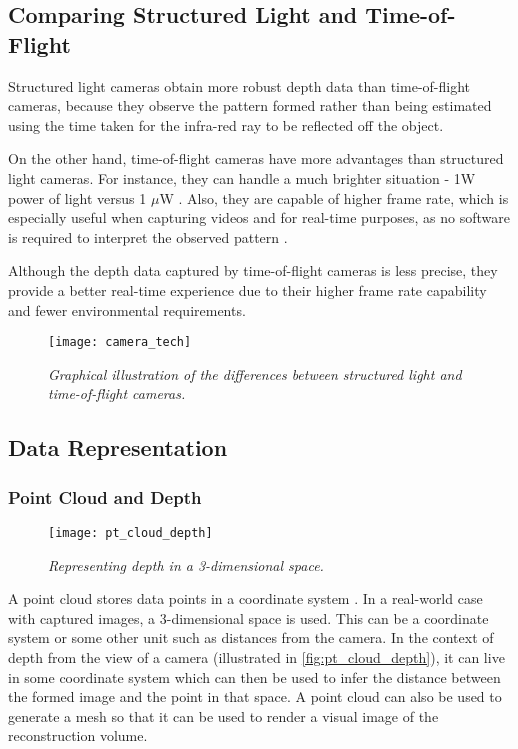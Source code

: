 \subsection{Comparing Structured Light and Time-of-Flight}
Structured light cameras obtain more robust depth data than time-of-flight cameras, because they observe the pattern formed rather than being estimated using the time taken for the infra-red ray to be reflected off the object. 

On the other hand, time-of-flight cameras have more advantages than structured light cameras. For instance, they can handle a much brighter situation - 1W power of light versus 1 $\mu$W \cite{kinect-version-compare}. Also, they are capable of higher frame rate, which is especially useful when capturing videos and for real-time purposes, as no software is required to interpret the observed pattern \cite{kinect-cam-tech}.

Although the depth data captured by time-of-flight cameras is less precise, they provide a better real-time experience due to their higher frame rate capability and fewer environmental requirements. 
\\

\begin{figure}[h]
  \centering
  \texttt{[image: camera\_tech]}
  \caption{\textit{Graphical illustration of the differences between structured light and time-of-flight cameras.}}
  \label{fig:camera_tech}
\end{figure}


\newpage
\subsection{Data Representation} \label{ssec:lit-data_rep}
\subsubsection{Point Cloud and Depth}

\begin{figure}[ht]
  \centering
  \texttt{[image: pt\_cloud\_depth]}
  \caption{\textit{Representing depth in a 3-dimensional space.}}
  \label{fig:pt_cloud_depth}
\end{figure}

A point cloud stores data points in a coordinate system \cite{chi-book}. In a real-world case with captured images, a 3-dimensional space is used. This can be a coordinate system or some other unit such as distances from the camera. In the context of depth from the view of a camera (illustrated in \autoref{fig:pt_cloud_depth}), it can live in some coordinate system which can then be used to infer the distance between the formed image and the point in that space. A point cloud can also be used to generate a mesh so that it can be used to render a visual image of the reconstruction volume.

